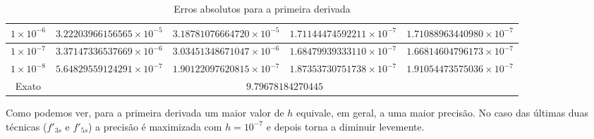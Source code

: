 \documentclass[12pt,a4paper]{article}
\begin{document}
\begin{table}[H]
\begin{adjustwidth}{-2cm}{2cm}
\begin{tabular}{|c|c|c|c|c|}
$1 \times 10^{-6}$ & $3.22203966156565 \times 10^{-5}$ & $3.18781076664720 \times 10^{-5}$ & $1.71144474592211 \times 10^{-7}$ & $1.71088963440980 \times 10^{-7}$ \\ \hline
$1 \times 10^{-7}$ & $3.37147336537669 \times 10^{-6}$ & $3.03451348671047 \times 10^{-6}$ & $1.68479939333110 \times 10^{-7}$ & $1.66814604796173 \times 10^{-7}$ \\ \hline
$1 \times 10^{-8}$ & $5.64829559124291 \times 10^{-7}$ & $1.90122097620815 \times 10^{-7}$ & $1.87353730751738 \times 10^{-7}$ & $1.91054473575036 \times 10^{-7}$ \\ \hline
Exato & \multicolumn{4}{c|}{$9.79678184270445$} \\ \hline
\end{tabular}
\caption{Erros absolutos para a primeira derivada}
\end{adjustwidth}
\end{table}

Como podemos ver, para a primeira derivada um maior valor de $h$ equivale, em geral, a uma maior precisão. No caso das últimas duas técnicas ($f'_{3s}$ e $f'_{5s}$) a precisão é maximizada com $h = 10^{-7}$ e depois torna a diminuir levemente.
\end{document}
